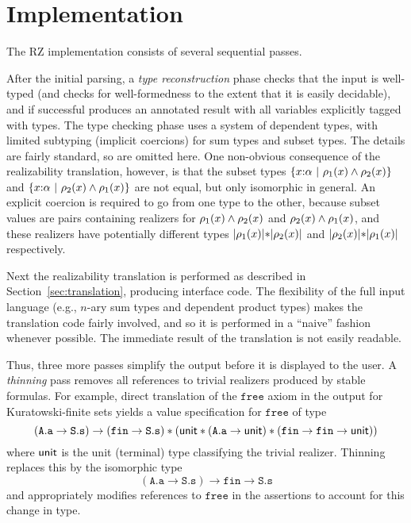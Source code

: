 \section{Implementation}
\label{sec:implementation}

The RZ implementation consists of several sequential passes.

After the initial parsing, a \emph{type reconstruction} phase checks
that the input is well-typed (and checks for well-formedness to the
extent that it is easily decidable), and if successful produces an
annotated result with all variables explicitly tagged with types. The
type checking phase uses a system of dependent types, with limited
subtyping (implicit coercions) for sum types and subset types. The
details are fairly standard, so are omitted here. One non-obvious
consequence of the realizability translation, however, is that the
subset types $\{x{:}\alpha\ |\ \rho_1(x)\land \rho_2(x)\}$ and
$\{x{:}\alpha\ |\ \rho_2(x)\land \rho_1(x)\}$ are not
equal, but only isomorphic in general. An
explicit coercion is required to go from one type to the other,
because subset values are pairs containing realizers for
$\rho_1(x)\land \rho_2(x)$ and
$\rho_2(x)\land \rho_1(x)$, and these realizers have
potentially different types $|\rho_1(x)|\mathtt{*}|\rho_2(x)|$ and
$|\rho_2(x)|\mathtt{*}|\rho_1(x)|$ respectively.

Next the realizability translation is performed as described in
Section~\ref{sec:translation}, producing interface code. The
flexibility of the full input language (e.g., $n$-ary sum types and
dependent product types) makes the translation code fairly involved,
and so it is performed in a ``naive'' fashion whenever possible. The
immediate result of the translation is not easily readable.
 

Thus, three more passes simplify the output before it is displayed to
the user. A \emph{thinning} pass removes all references to trivial
realizers produced by stable formulas. For example, direct translation
of the $\mathtt{free}$ axiom in the output for Kuratowski-finite sets
yields a value specification for $\mathtt{free}$ of type
%
\begin{equation*}
  (\mathtt{A.a} \to \mathtt{S.s}) \to 
  (\mathtt{fin} \to \mathtt{S.s}) * (\mathsf{unit} * (\mathtt{A.a} \to
  \mathsf{unit}) *
  (\mathtt{fin} \to \mathtt{fin} \to \mathsf{unit}))
\end{equation*}
%
where $\mathsf{unit}$ is the unit (terminal) type classifying the trivial
realizer. Thinning replaces this by the isomorphic type
%
\begin{equation*}
  (\mathtt{A.a} \to \mathtt{S.s}) \to \mathtt{fin} \to \mathtt{S.s}
\end{equation*}
%
and appropriately modifies references to $\mathtt{free}$ in the assertions to account for this change in type.

